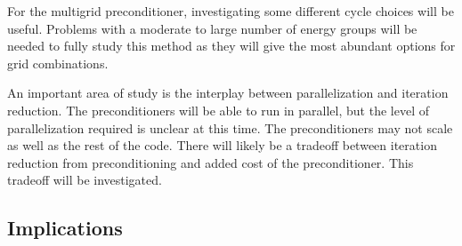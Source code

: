 For the multigrid preconditioner, investigating some different cycle choices will be useful. Problems with a moderate to large number of energy groups will be needed to fully study this method as they will give the most abundant options for grid  combinations.

An important area of study is the interplay between parallelization and iteration reduction. The preconditioners will be able to run in parallel, but the level of parallelization required is unclear at this time. The preconditioners may not scale as well as the rest of the code. There will likely be a tradeoff between iteration reduction from preconditioning and added cost of the preconditioner. This tradeoff will be investigated. 

\subsection{Implications}

